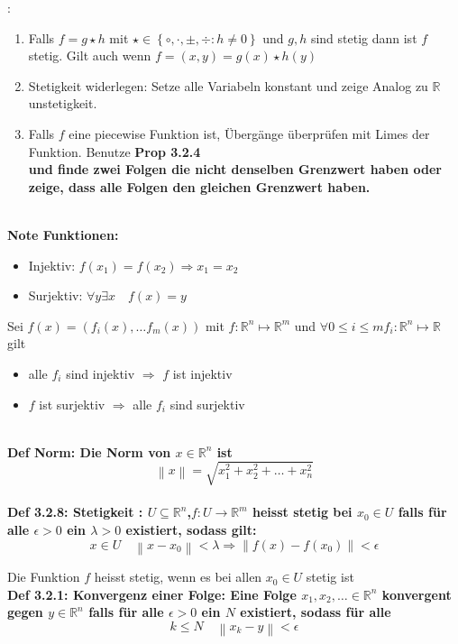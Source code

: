 \documentclass[7pt,landscape, margin = 0.1mm]{article}
\newcommand{\COL}[1]{ \color{chaptercolor} \bf{#1}\color{black}     \\}
\newcommand{\KRZ}[2]{\vspace{1mm} \hline \vspace{1mm} \color{chaptercolor}{RC #1}:\color{black} \   \hspace{0.2cm}\vspace{1mm}   {\begin{minipage}{20em}
#2 \end{minipage}} \vspace{1mm}  \hline \vspace{1mm}  \\}
\newcommand{\DEF}[2]{\color{chaptercolor}\bf{Def #1}:\color{black}    \hspace{0.2cm} #2 \\}
\newcommand{\NOTE}[2]{\color{chaptercolor}\bf{Note #1}:\color{black}    \hspace{0.2cm} #2 \\}
\begin{document}
\begin{multicols}{4}
\begin{flushleft}
{}
\KRZ{Stetigkeit}{
\begin{enumerate}
\item Falls $f=g \star h$ mit $\star \in \left\{\circ,\cdot , \pm, \div : h\neq 0 \right\}$  und $g,h$ sind stetig dann ist $f$ stetig. Gilt auch wenn $f=(x,y)=g(x) \star h(y)$
\item Stetigkeit widerlegen: Setze alle Variabeln konstant und zeige Analog zu $\mathbb{R}$ unstetigkeit. 
\item Falls $f$ eine piecewise Funktion ist, Übergänge überprüfen mit Limes der Funktion. Benutze \COL{Prop 3.2.4} und finde zwei Folgen die nicht denselben Grenzwert haben oder zeige, dass alle Folgen den gleichen Grenzwert haben.
\end{enumerate}

}


\NOTE{Funktionen}{
\begin{itemize}

\item Injektiv: $f(x_1)=f(x_2) \Rightarrow x_1 = x_2$
\item Surjektiv: $\forall y \exists x \quad f(x)=y$

\end{itemize}
Sei $f(x)=(f_i(x),\ldots f_m(x))$ mit $f: \mathbb{R}^n \mapsto \mathbb{R}^m$ und $\forall 0\leq i \leq m f_i: \mathbb{R}^n \mapsto \mathbb{R}$ gilt 
\begin{itemize}
\item alle $f_i$ sind injektiv $\Rightarrow$ $f$ ist injektiv
\item $f$ ist surjektiv $\Rightarrow$  alle $f_i$ sind surjektiv 
\end{itemize}



}

\DEF{Norm}{Die Norm von $x \in \mathbb{R}^{n}$ ist 
$$
\left\|x \right\| =\sqrt{x_{1}^{2}+x_{2}^{2}+ \ldots +x_{n}^{2}}
$$}

\DEF{3.2.8: Stetigkeit }{$U \subseteq \mathbb{R}^{n}$,$f:U \to \mathbb{R}^{m}$ heisst stetig bei $x_{0}\in U$ falls für alle $\epsilon >0$ ein $\lambda >0$ existiert, sodass gilt:
 $$
 x \in U \quad \left\|x-x_0 \right\| < \lambda \Rightarrow \left\|f(x)-f(x_{0})\right\| < \epsilon$$
  
  Die Funktion $f$  heisst stetig, wenn es bei allen $x_{0} \in U$ stetig ist}
  
 
\DEF{3.2.1: Konvergenz einer Folge}{Eine Folge $x_{1}, x_{2}, \ldots \in \mathbb{R}^{n}$ konvergent gegen $y  \in  \mathbb{R}^{n}$ falls für alle $\epsilon > 0$ ein $N$ existiert, sodass für alle $$k\leq N \quad \left\|x_{k}-y \right\| <\epsilon $$}


\end{flushleft}
\end{multicols}
\end{document}
